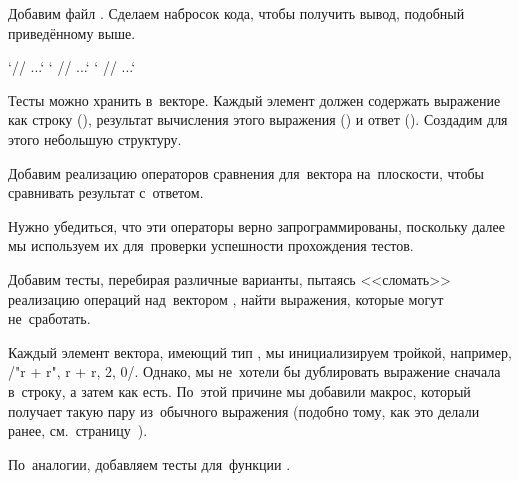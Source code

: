 
Добавим файл . Сделаем набросок кода, чтобы получить вывод, подобный приведённому выше.

\cpp`// ...`
\cpp`  // ...`
\cpp`  // ...`

Тесты можно хранить в~векторе. Каждый элемент должен содержать выражение как строку (), результат вычисления этого выражения () и ответ (). Создадим для этого небольшую структуру.


Добавим реализацию операторов сравнения для~вектора на~плоскости, чтобы сравнивать результат с~ответом.


\noindent Нужно убедиться, что эти операторы верно запрограммированы, поскольку далее мы используем их для~проверки успешности прохождения тестов.


Добавим тесты, перебирая различные варианты, пытаясь <<сломать>> реализацию операций над~вектором , найти выражения, которые могут не~сработать.


Каждый элемент вектора, имеющий тип , мы инициализируем тройкой, например, \cppinline/{"r + r", r + r, {2, 0}}/. Однако, мы не~хотели бы дублировать выражение сначала в~строку, а затем как есть. По~этой причине мы добавили макрос, который получает такую пару из~обычного выражения (подобно тому, как это делали ранее, см.~страницу~\pageref{par:macro}).


По~аналогии, добавляем тесты для~функции .

